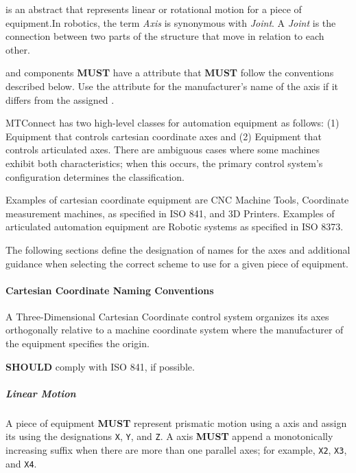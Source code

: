  is an abstract  that represents linear or rotational motion for a piece of equipment.In robotics, the term \textit{Axis} is synonymous with \textit{Joint}. A \textit{Joint} is the connection between two parts of the structure that move in relation to each other.

 and  components \textbf{MUST} have a  attribute that \textbf{MUST} follow the conventions described below. Use the  attribute for the manufacturer's name of the axis if it differs from the assigned .

\gls{MTConnect} has two high-level classes for automation equipment as follows: (1) Equipment that controls cartesian coordinate axes and (2) Equipment that controls articulated axes. There are ambiguous cases where some machines exhibit both characteristics; when this occurs, the primary control system's configuration determines the classification.

Examples of cartesian coordinate equipment are CNC Machine Tools, Coordinate measurement machines, as specified in ISO 841, and 3D Printers. Examples of articulated automation equipment are Robotic systems as specified in ISO 8373.

The following sections define the designation of names for the axes and additional guidance when selecting the correct scheme to use for a given piece of equipment.

\paragraph{Cartesian Coordinate Naming Conventions}\mbox{}
\label{sec:Cartesian Coordinate Naming Conventions}

A Three-Dimensional Cartesian Coordinate control system organizes its axes orthogonally relative to a machine coordinate system where the manufacturer of the equipment specifies the origin. 

  \textbf{SHOULD} comply with ISO 841, if possible.

\subparagraph{Linear Motion}\mbox{}
\label{sec:Linear Motion}

A piece of equipment \textbf{MUST} represent prismatic motion using a  axis  and assign its  using the designations \texttt{X}, \texttt{Y}, and \texttt{Z}. A  axis  \textbf{MUST} append a monotonically increasing suffix when there are more than one parallel axes; for example, \texttt{X2}, \texttt{X3}, and \texttt{X4}. 

